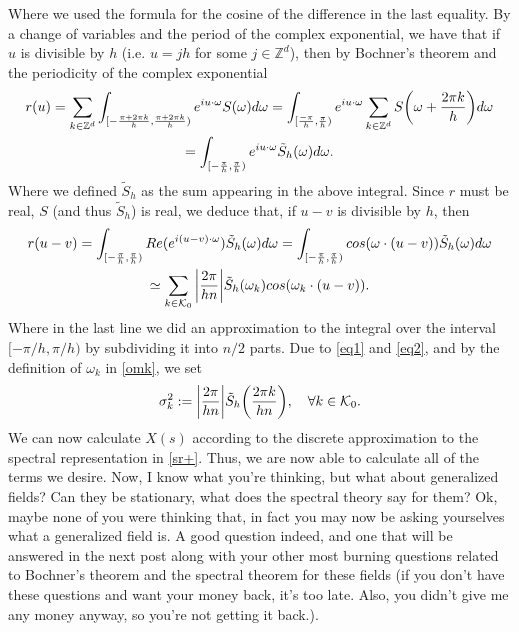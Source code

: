 \documentclass[12pt]{article}
\begin{document}
Where we used the formula for the cosine of the difference in the last equality.
By a change of variables and the period of the complex exponential, we have that if $u$ is divisible by  $h$ (i.e. $u=jh$ for some $j\in\mathbb{Z}^d$), then by Bochner's theorem and the periodicity of the complex exponential
\begin{multline*}
	r(u)=\sum_{k\in {\mathbb Z}^d} \int_{[-\frac{\pi+2\pi k}{h},\frac{\pi+2\pi k}{h})} e^{iu\cdot\omega}S(\omega)d\omega= \int_{[\frac{-\pi}{h},\frac{\pi}{h})} e^{iu\cdot\omega}\sum_{k\in {\mathbb Z}^d} S\qty(\omega+ \frac{ 2\pi k}{h})d\omega\\=\int_{[-\frac{\pi}{h},\frac{\pi}{h})} e^{iu\cdot\omega}\tilde{S}_h(\omega)d\omega.
\end{multline*}
Where we defined $\tilde{S}_h$ as the sum appearing in the above integral.
Since $r$ must be real, $S$ (and thus $\tilde{S}_h$) is real, we deduce that, if $u-v$ is divisible by  $h$, then
\begin{multline}\label{eq2}
	r(u-v)=\int_{[-\frac{\pi}{h},\frac{\pi}{h})} Re(e^{i(u-v)\cdot\omega})\tilde{S}_h(\omega)d\omega=\int_{[-\frac{\pi}{h},\frac{\pi}{h})}cos(\omega\cdot(u-v)) \tilde{S}_h(\omega)d\omega\\
	\simeq \sum_{k \in \mathcal{K}_0}\abs{\frac{2\pi}{hn}}\tilde{S}_h(\omega_k)cos(\omega_k\cdot(u-v)).
\end{multline}
Where in the last line we did an approximation to the integral over the interval $[-\pi/h,\pi/h)$ by subdividing it into $n/2$ parts.
Due to \eqref{eq1} and \eqref{eq2}, and by the definition of $\omega_k$ in \eqref{omk},  we set
\begin{equation*}
	\sigma _k^2:= \abs{\frac{2\pi}{hn}}\tilde{S}_h\qty(\frac{2\pi k}{hn}),\quad\forall k\in \mathcal{K}_0.
\end{equation*}
We can now calculate $X(s)$ according to the discrete approximation to the spectral representation in \eqref{sr+}. Thus, we are now able to calculate all of the terms we desire.
Now, I know what you're thinking, but what about generalized fields? Can they be stationary, what does the spectral theory say for them? Ok, maybe none of you were thinking that, in fact you may now be asking yourselves what a generalized field is. A good question indeed, and one that will be answered in the next post along with your other most burning questions related to Bochner's theorem and the spectral theorem for these fields (if you don't have these questions and want your money back, it's too late. Also, you didn't give me any money anyway, so you're not getting it back.).
\end{document}
